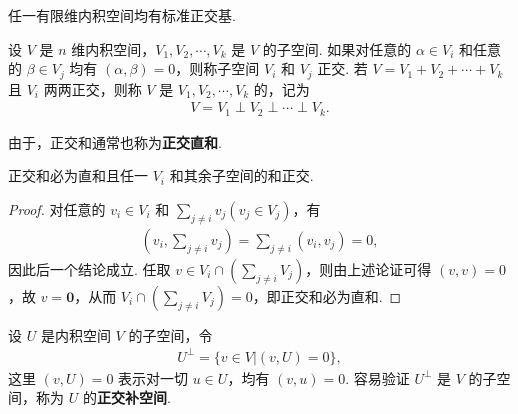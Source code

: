 \documentclass[../../main.tex]{subfiles}
\begin{document}
\begin{corollary}\label{corollary:有限维内积空间必有标准正交基}
任一有限维内积空间均有标准正交基. 
\end{corollary}

\begin{definition}[正交和]
设 $V$ 是 $n$ 维内积空间，$V_1, V_2, \cdots, V_k$ 是 $V$ 的子空间. 如果对任意的 $\alpha \in V_i$ 和任意的 $\beta \in V_j$ 均有 $(\alpha, \beta) = 0$，则称子空间 $V_i$ 和 $V_j$ 正交. 若 $V = V_1 + V_2 + \cdots + V_k$ 且 $V_i$ 两两正交，则称 $V$ 是 $V_1, V_2, \cdots, V_k$ 的，记为
\begin{align*}
V = V_1 \perp V_2 \perp \cdots \perp V_k.
\end{align*}
\end{definition}
\begin{remark}
由于，正交和通常也称为\textbf{正交直和}.
\end{remark}

\begin{lemma}\label{lemma:正交和必为直和}
正交和必为直和且任一 $V_i$ 和其余子空间的和正交.
\end{lemma}
\begin{proof}
对任意的 $v_i \in V_i$ 和 $\sum_{j \neq i}v_j (v_j \in V_j)$，有
\begin{align*}
(v_i, \sum_{j \neq i}v_j) = \sum_{j \neq i}(v_i, v_j) = 0,
\end{align*}
因此后一个结论成立. 任取 $v \in V_i \cap (\sum_{j \neq i}V_j)$，则由上述论证可得 $(v, v) = 0$，故 $v = \mathbf{0}$，从而 $V_i \cap (\sum_{j \neq i}V_j) = 0$，即正交和必为直和.
\end{proof}

\begin{definition}[正交补空间]\label{definition:正交补空间}
设 $U$ 是内积空间 $V$ 的子空间，令
\begin{align*}
U^\perp = \{v \in V | (v, U) = 0\},
\end{align*}
这里 $(v, U) = 0$ 表示对一切 $u \in U$，均有 $(v, u) = 0$. 容易验证 $U^\perp$ 是 $V$ 的子空间，称为 $U$ 的\textbf{正交补空间}.
\end{definition}
\end{document}
